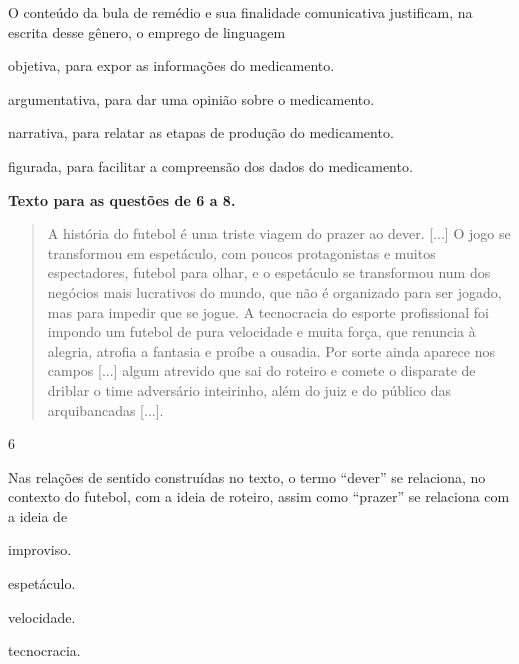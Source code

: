 
O conteúdo da bula de remédio e sua finalidade comunicativa justificam,
na escrita desse gênero, o emprego de linguagem

\begin{escolha}
\item objetiva, para expor as informações do medicamento.

\item argumentativa, para dar uma opinião sobre o medicamento.

\item narrativa, para relatar as etapas de produção do medicamento.

\item figurada, para facilitar a compreensão dos dados do medicamento.
\end{escolha}


\textbf{Texto para as questões de 6 a 8.}

\begin{quote}
A história do futebol é uma triste viagem do prazer ao dever. {[}...{]}
O jogo se transformou em espetáculo, com poucos protagonistas e muitos
espectadores, futebol para olhar, e o espetáculo se transformou num dos
negócios mais lucrativos do mundo, que não é organizado para ser jogado,
mas para impedir que se jogue. A tecnocracia do esporte profissional foi
impondo um futebol de pura velocidade e muita força, que renuncia à
alegria, atrofia a fantasia e proíbe a ousadia. Por sorte ainda aparece
nos campos {[}...{]} algum atrevido que sai do roteiro e comete o
disparate de driblar o time adversário inteirinho, além do juiz e do
público das arquibancadas {[}...{]}.
\end{quote}


\num{6}

Nas relações de sentido construídas no texto, o termo ``dever'' se
relaciona, no contexto do futebol, com a ideia de roteiro, assim como
``prazer'' se relaciona com a ideia de

\begin{escolha}
\item improviso.

\item espetáculo.

\item velocidade.

\item tecnocracia.
\end{escolha}

